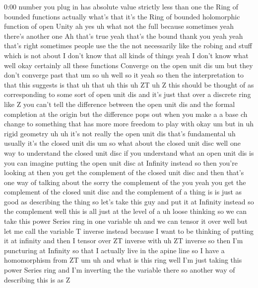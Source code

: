 \begin{unfinished}{0:00}
number  you  plug  in  has  absolute  value
strictly  less  than  one  the  Ring  of
bounded  functions  actually  what's  that
it's  the  Ring  of  bounded  holomorphic
function  of  open  Unity  ah  yes  uh  what
not  the  full
because  sometimes  yeah  there's  another
one  Ah  that's  true  yeah  that's  the  bound
thank  you  yeah  yeah  that's  right
sometimes  people  use  the  the  not
necessarily  like  the  robing  and  stuff
which  is  not  about  I  don't  know  that  all
kinds  of  things  yeah  I  don't  know
what  well  okay  certainly  all  these
functions  Converge  on  the  open  unit  dis
um  but  they  don't  converge  past  that
um  so
uh  well  so  it  yeah  so  then  the
interpretation  to  that  this  suggests  is
that  uh  that  uh  this  uh  ZT  uh
Z  this  should  be  thought  of  as
corresponding  to  some  sort  of  open  unit
dis  and  it's  just  that  over  a  discrete
ring  like  Z  you  can't  tell  the
difference  between  the  open  unit  dis  and
the  formal  completion  at  the  origin  but
the  difference  pops  out  when  you  make  a
a  base  ch  change  to  something  that  has
more  more  freedom  to  play
with
okay
um  but  in  uh  rigid  geometry
uh  uh  it's  not  really  the  open  unit  dis
that's  fundamental  uh  usually  it's  the
closed  unit  dis  um  so  what  about  the
closed  unit  disc
well  one  way  to  understand  the  closed
unit  disc  if  you  understand  what  an  open
unit  dis  is  you  can  imagine  putting  the
open  unit  disc  at  Infinity  instead  so
then  you're  looking  at  then  you  get  the
complement  of  the  closed  unit  disc  and
then  that's  one  way  of  talking  about  the
sorry  the  complement  of  the  you  yeah  you
get  the  complement  of  the  closed  unit
disc  and  the  complement  of  a  thing  is  is
just  as  good  as  describing  the  thing  so
let's  take  this  guy  and  put  it  at
Infinity  instead  so  the
complement  well  this  is  all  just  at  the
level  of  a  uh  loose  thinking  so  we  can
take  this  power  Series  ring  in  one
variable  uh  and  we  can  tensor  it  over
well  but  let  me  call  the  variable  T
inverse  instead  because  I  want  to  be
thinking  of  putting  it  at  infinity  and
then  I  tensor  over  ZT  inverse  with  uh  ZT
inverse  so  then  I'm  puncturing  at
Infinity  so  that  I  actually  live  in  the
apine  line  so  I  have  a  homomorphism  from
ZT
um  uh  and  what  is  this  ring  well  I'm
just  taking  this  power  Series  ring  and
I'm  inverting  the  the  variable  there  so
another  way  of  describing  this  is  as  Z

\end{unfinished}
